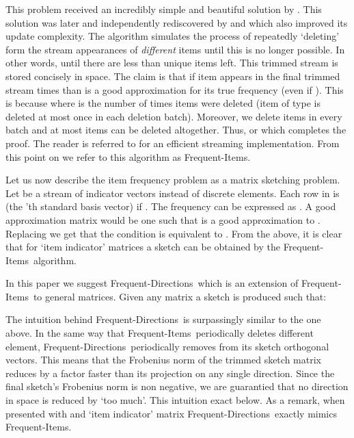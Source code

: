\documentclass[]{article}
\newcommand{\FI}{Frequent-Items}
\newcommand{\FD}{Frequent-Directions}
\begin{document}
This problem received an incredibly simple and beautiful solution by \cite{Misra1982}.
This solution was later and independently rediscovered 
by \cite{DemaineLopezAlejandroMunro2002} and \cite{Karp03} which also improved its update complexity.
The algorithm simulates the process of repeatedly `deleting' form the 
stream  appearances of {\it different} items until this is no longer possible. 
In other words, until there are less than  unique items left. 
This trimmed stream is stored concisely in  space.
The claim is that if item  appears in the final trimmed stream  times 
than  is a good approximation for its true frequency  (even if ).
This is because  where  is the number of times items were deleted (item of type  is deleted at most once in each deletion batch). 
Moreover, we delete  items in every batch and at most  items can be deleted altogether. Thus,  or  which completes the proof.
The reader is referred to \cite{Karp03} for an efficient streaming implementation.
From this point on we refer to this algorithm as \FI. 






Let us now describe the item frequency problem as a matrix sketching problem. 
Let  be a stream of indicator vectors  instead of discrete elements.
Each row in  is  (the 'th standard basis vector) if .
The frequency  can be expressed as . 
A good approximation matrix  would be one such that  is a good approximation to .
Replacing  we get that the condition 
is equivalent to . 
From the above, it is clear that for `item indicator' matrices a sketch  can be
obtained by the \FI~algorithm.

In this paper we suggest \FD~which is an extension of \FI~to general matrices. 
Given any matrix  a sketch  is produced such that:

The intuition behind \FD~is surpassingly similar to the one above.
In the same way that \FI~periodically deletes  different element, \FD~periodically removes from its sketch  orthogonal vectors.
This means that the Frobenius norm of the trimmed sketch matrix reduces by a factor  faster than its projection on any single direction.
Since the final sketch's Frobenius norm is non negative, we are guarantied that no direction in space is reduced by `too much'. 
This intuition exact below.
As a remark, when presented with and `item indicator' matrix \FD~exactly mimics \FI.
\end{document}
